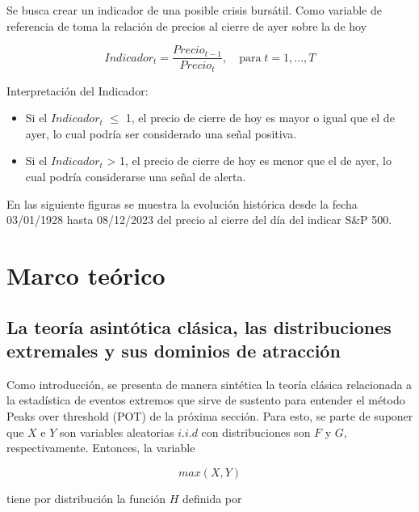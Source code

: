 \documentclass[
  12pt]{article}
\begin{document}
Se busca crear un indicador de una posible crisis bursátil. Como
variable de referencia de toma la relación de precios al cierre de ayer
sobre la de hoy

\begin{equation}
Indicador_t=\frac{Precio_{t-1}}{Precio_t},\quad\text{para}\; t=1,...,T 
\end{equation} \vspace{0.5cm}

Interpretación del Indicador:

\begin{itemize}
\item Si el $Indicador_t$    $\leq$ 1, el precio de cierre de hoy es mayor o igual que el de ayer, lo cual podría ser considerado una señal positiva.
\item Si el $Indicador_t$ > 1, el precio de cierre de hoy es menor que el de ayer, lo cual podría considerarse una señal de alerta.
\end{itemize}

\newpage

En las siguiente figuras se muestra la evolución histórica desde la
fecha 03/01/1928 hasta 08/12/2023 del precio al cierre del día del
indicar S\&P 500.

\newpage

\section{Marco teórico}\label{marco-teuxf3rico}

\subsection{La teoría asintótica clásica, las distribuciones extremales
y sus dominios de
atracción}\label{la-teoruxeda-asintuxf3tica-cluxe1sica-las-distribuciones-extremales-y-sus-dominios-de-atracciuxf3n}

Como introducción, se presenta de manera sintética la teoría clásica
relacionada a la estadística de eventos extremos que sirve de sustento
para entender el método Peaks over threshold (POT) de la próxima
sección. Para esto, se parte de suponer que \(X\) e \(Y\) son variables
aleatorias \(i.i.d\) con distribuciones son \(F\) y \(G\),
respectivamente. Entonces, la variable

\begin{equation}
max(X,Y)
\end{equation}

tiene por distribución la función \(H\) definida por
\end{document}
